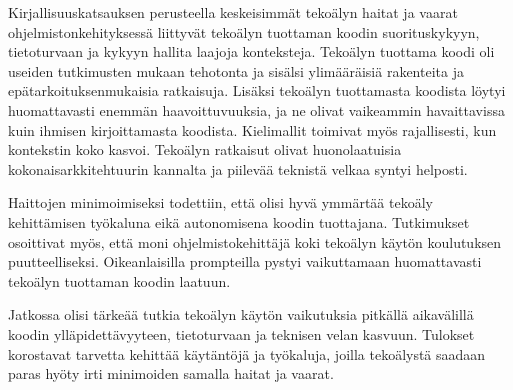 \documentclass[utf8,bachelor]{gradu3}
\begin{document}
Kirjallisuuskatsauksen perusteella keskeisimmät tekoälyn haitat ja vaarat ohjelmistonkehityksessä liittyvät tekoälyn tuottaman koodin suorituskykyyn, tietoturvaan ja kykyyn hallita laajoja konteksteja. Tekoälyn tuottama koodi oli useiden tutkimusten mukaan tehotonta ja sisälsi ylimääräisiä rakenteita ja epätarkoituksenmukaisia ratkaisuja. Lisäksi tekoälyn tuottamasta koodista löytyi huomattavasti enemmän haavoittuvuuksia, ja ne olivat vaikeammin havaittavissa kuin ihmisen kirjoittamasta koodista. Kielimallit toimivat myös rajallisesti, kun kontekstin koko kasvoi. Tekoälyn ratkaisut olivat huonolaatuisia kokonaisarkkitehtuurin kannalta ja piilevää teknistä velkaa syntyi helposti.

Haittojen minimoimiseksi todettiin, että olisi hyvä ymmärtää tekoäly kehittämisen työkaluna eikä autonomisena koodin tuottajana. Tutkimukset osoittivat myös, että moni ohjelmistokehittäjä koki tekoälyn käytön koulutuksen puutteelliseksi. Oikeanlaisilla prompteilla pystyi vaikuttamaan huomattavasti tekoälyn tuottaman koodin laatuun.

Jatkossa olisi tärkeää tutkia tekoälyn käytön vaikutuksia pitkällä aikavälillä koodin ylläpidettävyyteen, tietoturvaan ja teknisen velan kasvuun. Tulokset korostavat tarvetta kehittää käytäntöjä ja työkaluja, joilla tekoälystä saadaan paras hyöty irti minimoiden samalla haitat ja vaarat.

\printbibliography
\end{document}
